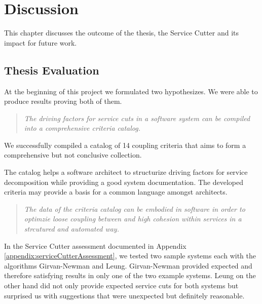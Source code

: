 \chapter{Discussion}

This chapter discusses the outcome of the thesis, the Service Cutter and its impact for future work.



\section{Thesis Evaluation}

At the beginning of this project we formulated two hypothesizes. We were able to produce results proving both of them.

\begin{quote}
	\textit{The driving factors for service cuts in a software system can be compiled into a comprehensive criteria catalog.}
\end{quote}

We successfully compiled a catalog of 14 coupling criteria that aims to form a comprehensive but not conclusive collection. 

The catalog helps a software architect to structurize driving factors for service decomposition while providing a good system documentation. The developed criteria may provide a basis for a common language amongst architects. 


\begin{quote}
	\textit{The data of the criteria catalog can be embodied in software in order to optimzie loose coupling between and high cohesion within services in a strcutured and automated way.}
\end{quote}

In the Service Cutter assessment documented in Appendix \ref{appendix:serviceCutterAssessment}, we tested two sample systems each with the algorithms Girvan-Newman and Leung. Girvan-Newman provided expected and therefore satisfying results in only one of the two example systems. Leung on the other hand did not only provide expected service cuts for both systems but surprised us with suggestions that were unexpected but definitely reasonable.  


